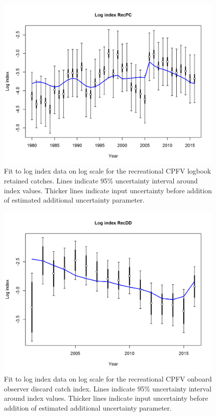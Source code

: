 \documentclass[12pt,]{article}
\begin{document}
\begin{figure}[htbp]
\centering
\includegraphics{r4ss/plots_mod1/index5_logcpuefit_RecPC.png}
\caption{Fit to log index data on log scale for the recreational CPFV
logbook retained catches. Lines indicate 95\% uncertainty interval
around index values. Thicker lines indicate input uncertainty before
addition of estimated additional uncertainty parameter.
\label{fig:index5_logcpuefit_RecPC}}
\end{figure}

\begin{figure}[htbp]
\centering
\includegraphics{r4ss/plots_mod1/index5_logcpuefit_RecDD.png}
\caption{Fit to log index data on log scale for the recreational CPFV
onboard observer discard catch index. Lines indicate 95\% uncertainty
interval around index values. Thicker lines indicate input uncertainty
before addition of estimated additional uncertainty parameter.
\label{fig:Fleet6_index5_logcpuefit_RecDD}}
\end{figure}
\end{document}
